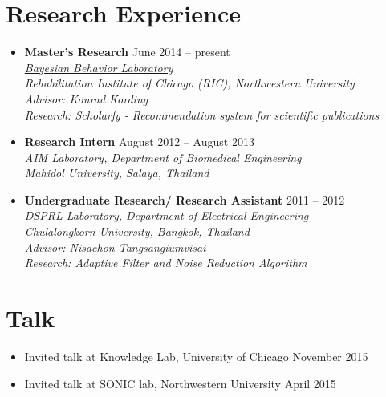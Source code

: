 \documentclass[margin,line]{res}
\begin{document}
\begin{resume}
\begin{itemize}[leftmargin=0cm, label={}]
\end{itemize}



\section{\sc Research Experience}

\begin{itemize}[leftmargin=0cm, label={}]

\item {\bf Master's Research}								\hfill{June 2014 -- present}\\
{\em \href{http://klab.smpp.northwestern.edu/wiki/index.php5/Main_Page}{Bayesian Behavior Laboratory}\\
Rehabilitation Institute of Chicago (RIC), Northwestern University \\
Advisor: Konrad Kording \\
Research: Scholarfy - Recommendation system for scientific publications}

\item {\bf Research Intern}							\hfill{August 2012 -- August 2013}\\
{\em AIM Laboratory, Department of Biomedical Engineering\\
Mahidol University, Salaya, Thailand}

\item {\bf Undergraduate Research/ Research Assistant}		\hfill{2011 -- 2012}\\
{\em DSPRL Laboratory, Department of Electrical Engineering\\
Chulalongkorn University, Bangkok, Thailand\\
Advisor: \href{http://nisachon.lecturer.eng.chula.ac.th}{Nisachon Tangsangiumvisai}\\
Research: Adaptive Filter and Noise Reduction Algorithm}

\end{itemize}




\section{\sc Talk}

\begin{itemize}[leftmargin=0cm, label={}]

\item Invited talk at Knowledge Lab, University of Chicago 	\hfill November 2015
\item Invited talk at SONIC lab, Northwestern University		\hfill April 2015


\end{itemize}
\end{resume}
\end{document}
